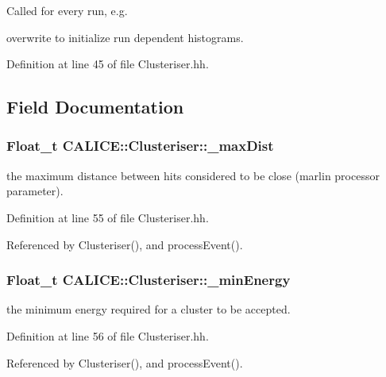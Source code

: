 Called for every run, e.\-g. 

overwrite to initialize run dependent histograms. 

Definition at line 45 of file Clusteriser.\-hh.



\subsection{Field Documentation}
\subsubsection[{\-\_\-max\-Dist}]{\setlength{\rightskip}{0pt plus 5cm}Float\-\_\-t C\-A\-L\-I\-C\-E\-::\-Clusteriser\-::\-\_\-max\-Dist\hspace{0.3cm}{\ttfamily [protected]}}\label{classCALICE_1_1Clusteriser_a807005cec4f96c8a6b5aaac0def5e81b}


the maximum distance between hits considered to be close (marlin processor parameter). 



Definition at line 55 of file Clusteriser.\-hh.



Referenced by Clusteriser(), and process\-Event().

\subsubsection[{\-\_\-min\-Energy}]{\setlength{\rightskip}{0pt plus 5cm}Float\-\_\-t C\-A\-L\-I\-C\-E\-::\-Clusteriser\-::\-\_\-min\-Energy\hspace{0.3cm}{\ttfamily [protected]}}\label{classCALICE_1_1Clusteriser_adddac3244a642b766585fdb7653b2f16}


the minimum energy required for a cluster to be accepted. 



Definition at line 56 of file Clusteriser.\-hh.



Referenced by Clusteriser(), and process\-Event().

